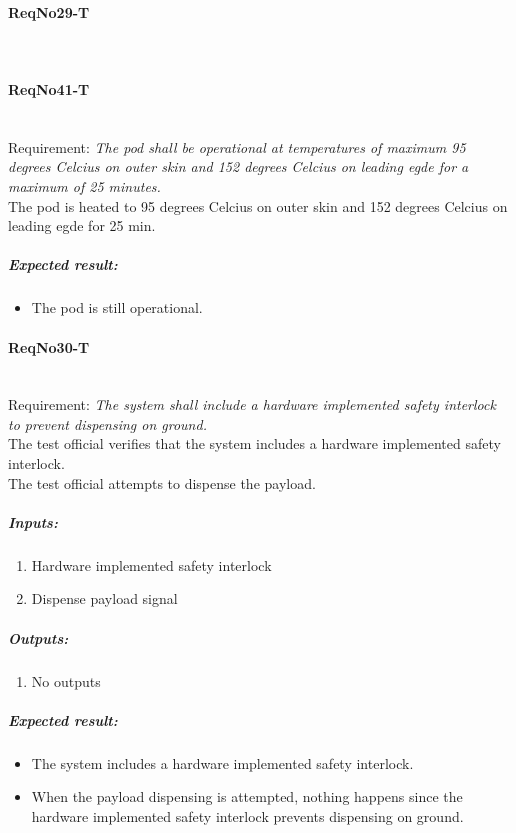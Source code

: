 \paragraph{ReqNo29-T}\mbox{}\\ %


\paragraph{ReqNo41-T}\mbox{}\\ %
Requirement: \textit{The pod shall be operational at temperatures of maximum 95 degrees Celcius on outer skin and 152 degrees Celcius on leading egde for a maximum of 25 minutes.}\\

The pod is heated to 95 degrees Celcius on outer skin and 152 degrees Celcius on leading egde for 25 min. 

	\subparagraph{Expected result:}
	\begin{itemize}
	\item The pod is still operational.
	\end{itemize}

\paragraph{ReqNo30-T}\mbox{}\\ %
Requirement: \textit{The system shall include a hardware implemented safety interlock to prevent dispensing on ground.}\\

The test official verifies that the system includes a hardware implemented safety interlock. \\
The test official attempts to dispense the payload.  
\subparagraph{Inputs:}
	\begin{enumerate}
	\item Hardware implemented safety interlock
	\item Dispense payload signal
	\end{enumerate}
\subparagraph{Outputs:}
	\begin{enumerate}
	\item No outputs
	\end{enumerate}
\subparagraph{Expected result:}
	\begin{itemize}
	\item The system includes a hardware implemented safety interlock.
	\item When the payload dispensing is attempted, nothing happens since the hardware implemented safety interlock prevents dispensing on ground.
	\end{itemize}


